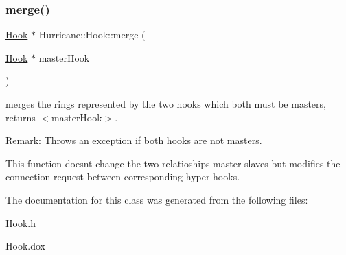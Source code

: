 \subsubsection{\texorpdfstring{merge()}{merge()}}
{\footnotesize\ttfamily \hyperlink{classHurricane_1_1Hook}{Hook} $\ast$ Hurricane\+::\+Hook\+::merge (\begin{DoxyParamCaption}\item[{\hyperlink{classHurricane_1_1Hook}{Hook} $\ast$}]{master\+Hook }\end{DoxyParamCaption})}

merges the rings represented by the two hooks which both must be masters, returns {\ttfamily $<$master\+Hook$>$}.

\begin{DoxyParagraph}{Remark\+:}
Throws an exception if both hooks are not masters.
\end{DoxyParagraph}
This function doesn\textquotesingle{}t change the two relatioships master-\/slaves but modifies the connection request between corresponding hyper-\/hooks. 

The documentation for this class was generated from the following files\+:\begin{DoxyCompactItemize}
\item 
Hook.\+h\item 
Hook.\+dox\end{DoxyCompactItemize}
